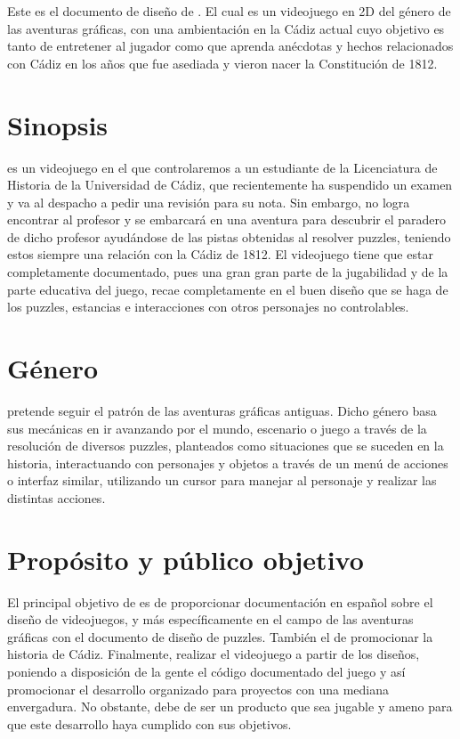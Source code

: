 Este es el documento de diseño de \nombrejuego. El cual es un videojuego en 2D del género de las aventuras gráficas, con una ambientación en la Cádiz actual cuyo objetivo es tanto de entretener al jugador como que aprenda anécdotas y hechos relacionados con Cádiz en los años que fue asediada y vieron nacer la Constitución de 1812.

    \section{Sinopsis}
        \nombrejuego es un videojuego en el que controlaremos a un estudiante de la Licenciatura de Historia de la Universidad de Cádiz, que recientemente ha suspendido un examen y va al despacho a pedir una revisión para su nota. Sin embargo, no logra encontrar al profesor y se embarcará en una aventura para descubrir el paradero de dicho profesor ayudándose de las pistas obtenidas al resolver puzzles, teniendo estos siempre una relación con la Cádiz de 1812. El videojuego tiene que estar completamente documentado, pues una gran gran parte de la jugabilidad y de la parte educativa del juego, recae completamente en el buen diseño que se haga de los puzzles, estancias e interacciones con otros personajes no controlables.
        
    \section{Género}
        \nombrejuego pretende seguir el patrón de las aventuras gráficas antiguas. Dicho género basa sus mecánicas en ir avanzando por el mundo, escenario o juego a través de la resolución de diversos puzzles, planteados como situaciones que se suceden en la historia, interactuando con personajes y objetos a través de un menú de acciones o interfaz similar, utilizando un cursor para manejar al personaje y realizar las distintas acciones.
        
    \section{Propósito y público objetivo}
        El principal objetivo de \nombrejuego es de proporcionar documentación en español sobre el diseño de videojuegos, y más específicamente en el campo de las aventuras gráficas con el documento de diseño de puzzles. También el de promocionar la historia de Cádiz. Finalmente, realizar el videojuego a partir de los diseños, poniendo a disposición de la gente el código documentado del juego y así promocionar el desarrollo organizado para proyectos con una mediana envergadura. No obstante, debe de ser un producto que sea jugable y ameno para que este desarrollo haya cumplido con sus objetivos.
        
